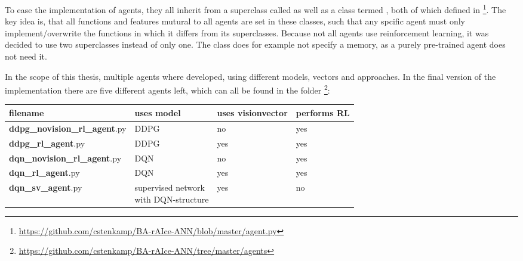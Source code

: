To ease the implementation of agents, they all inherit from a superclass called  as well as a class termed , both of which defined in \footnote{\url{https://github.com/cstenkamp/BA-rAIce-ANN/blob/master/agent.py}}. The key idea is, that all functions and features mutural to all agents are set in these classes, such that any spcific agent must only implement/overwrite the functions in which it differs from its superclasses. Because not all agents use reinforcement learning, it was decided to use two superclasses instead of only one. The class  does for example not specify a memory, as a purely pre-trained agent does not need it.

In the scope of this thesis, multiple agents where developed, using different models, vectors and approaches. In the final version of the implementation there are five different agents left, which can all be found in the folder \footnote{\url{https://github.com/cstenkamp/BA-rAIce-ANN/tree/master/agents}}:
 \\[1em]
\begin{tabular}{l l l l}
	filename & uses model & uses visionvector & performs RL\\
	\hline
	\textbf{ddpg\_novision\_rl\_agent}.py & DDPG & no & yes\\	
	\textbf{ddpg\_rl\_agent}.py & DDPG & yes & yes\\
	\textbf{dqn\_novision\_rl\_agent}.py & DQN & no & yes\\
	\textbf{dqn\_rl\_agent}.py & DQN & yes & yes\\
	\textbf{dqn\_sv\_agent}.py & \blap{supervised network\\ with DQN-structure} & yes & no\\[2em]
\end{tabular}






